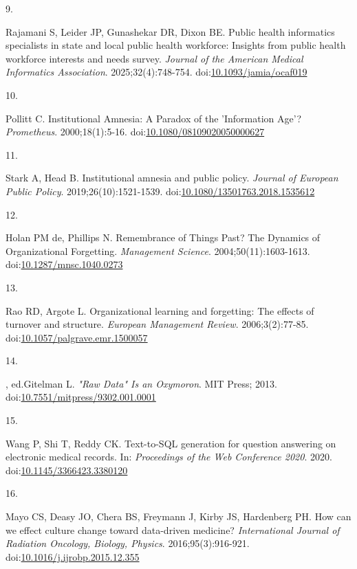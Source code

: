 \documentclass[
  american,
  11pt,
  letterpaper,
  oneside  ,captions=tableheading
]{scrartcl}
\newlength{\cslhangindent}
\newlength{\csllabelwidth}
\newenvironment{CSLReferences}[2] %
 {\begin{list}{}{%
  \setlength{\itemindent}{0pt}
  \setlength{\leftmargin}{0pt}
  \setlength{\parsep}{0pt}
  \ifodd #1
   \setlength{\leftmargin}{\cslhangindent}
   \setlength{\itemindent}{-1\cslhangindent}
  \fi
  \setlength{\itemsep}{#2\baselineskip}}}
 {\end{list}}
\newcommand{\CSLLeftMargin}[1]{\parbox[t]{\csllabelwidth}{\strut#1\strut}}
\newcommand{\CSLRightInline}[1]{\parbox[t]{\linewidth - \csllabelwidth}{\strut#1\strut}}
\begin{document}
\begin{CSLReferences}{0}{1}
\CSLLeftMargin{9. }%
\CSLRightInline{Rajamani S, Leider JP, Gunashekar DR, Dixon BE. {Public
health informatics specialists in state and local public health
workforce: Insights from public health workforce interests and needs
survey}. \emph{Journal of the American Medical Informatics Association}.
2025;32(4):748-754.
doi:\href{https://doi.org/10.1093/jamia/ocaf019}{10.1093/jamia/ocaf019}}

\CSLLeftMargin{10. }%
\CSLRightInline{Pollitt C. {Institutional Amnesia: A Paradox of the
'Information Age'?} \emph{Prometheus}. 2000;18(1):5-16.
doi:\href{https://doi.org/10.1080/08109020050000627}{10.1080/08109020050000627}}

\CSLLeftMargin{11. }%
\CSLRightInline{Stark A, Head B. {Institutional amnesia and public
policy}. \emph{Journal of European Public Policy}.
2019;26(10):1521-1539.
doi:\href{https://doi.org/10.1080/13501763.2018.1535612}{10.1080/13501763.2018.1535612}}

\CSLLeftMargin{12. }%
\CSLRightInline{Holan PM de, Phillips N. {Remembrance of Things Past?
The Dynamics of Organizational Forgetting}. \emph{Management Science}.
2004;50(11):1603-1613.
doi:\href{https://doi.org/10.1287/mnsc.1040.0273}{10.1287/mnsc.1040.0273}}

\CSLLeftMargin{13. }%
\CSLRightInline{Rao RD, Argote L. Organizational learning and
forgetting: The effects of turnover and structure. \emph{European
Management Review}. 2006;3(2):77-85.
doi:\href{https://doi.org/10.1057/palgrave.emr.1500057}{10.1057/palgrave.emr.1500057}}

\CSLLeftMargin{14. }%
\CSLRightInline{, ed.Gitelman L. \emph{{"Raw Data" Is an Oxymoron}}. MIT
Press; 2013.
doi:\href{https://doi.org/10.7551/mitpress/9302.001.0001}{10.7551/mitpress/9302.001.0001}}

\CSLLeftMargin{15. }%
\CSLRightInline{Wang P, Shi T, Reddy CK. {Text-to-SQL generation for
question answering on electronic medical records}. In: \emph{Proceedings
of the Web Conference 2020}. 2020.
doi:\href{https://doi.org/10.1145/3366423.3380120}{10.1145/3366423.3380120}}

\CSLLeftMargin{16. }%
\CSLRightInline{Mayo CS, Deasy JO, Chera BS, Freymann J, Kirby JS,
Hardenberg PH. {How can we effect culture change toward data-driven
medicine?} \emph{International Journal of Radiation Oncology, Biology,
Physics}. 2016;95(3):916-921.
doi:\href{https://doi.org/10.1016/j.ijrobp.2015.12.355}{10.1016/j.ijrobp.2015.12.355}}


\end{CSLReferences}
\end{document}
